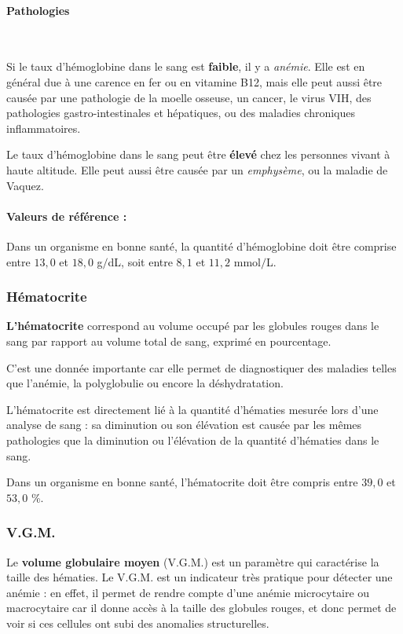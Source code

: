 \documentclass[12pt]{article}
\begin{document}
		\paragraph{Pathologies}\mbox{~}
	
	Si le taux d'hémoglobine dans le sang est \textbf{faible}, il y a \textit{anémie}. Elle est en général due à une carence en fer ou en vitamine B12, mais elle peut aussi être causée par une pathologie de la moelle osseuse, un cancer, le virus VIH, des pathologies gastro-intestinales et hépatiques, ou des maladies chroniques inflammatoires.
	
	Le taux d'hémoglobine dans le sang peut être \textbf{élevé} chez les personnes vivant à haute altitude. Elle peut aussi être causée par un \textit{emphysème}, ou la maladie de Vaquez.
	
		\paragraph{Valeurs de référence :} Dans un organisme en bonne santé, la quantité d'hémoglobine doit être comprise entre $13,0$ et $18,0$ g$/$dL, soit entre $8,1$ et $11,2$ mmol$/$L.
		
	\subsubsection{Hématocrite}
	\textbf{L'hématocrite} correspond au volume occupé par les globules rouges dans le sang par rapport au volume total de sang, exprimé en pourcentage.
	
	C'est une donnée importante car elle permet de diagnostiquer des maladies telles que l'anémie, la polyglobulie ou encore la déshydratation. 
	
	L'hématocrite est directement lié à la quantité d'hématies mesurée lors d'une analyse de sang : sa diminution ou son élévation est causée par les mêmes pathologies que la diminution ou l'élévation de la quantité d'hématies dans le sang.
	
	Dans un organisme en bonne santé, l'hématocrite doit être compris entre $39,0$ et $53,0$ \%.
	
	\subsubsection{V.G.M.}
	Le \textbf{volume globulaire moyen} (V.G.M.) est un paramètre qui caractérise la taille des hématies. Le V.G.M. est un indicateur très pratique pour détecter une anémie : en effet, il permet de rendre compte d'une anémie microcytaire ou macrocytaire car il donne accès à la taille des globules rouges, et donc permet de voir si ces cellules ont subi des anomalies structurelles.
	
\end{document}

